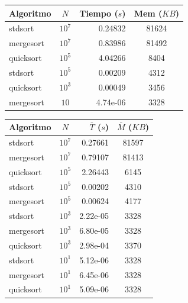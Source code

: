 \begin{itemize}
\begin{table}[H]
    \begin{minipage}[t]{0.45\textwidth}
        \centering
        \small
        \begin{tabular}{|l|c|r|c|}
            \hline
            \textbf{Algoritmo} & \textbf{$N$} & \textbf{Tiempo ($s$)} & \textbf{Mem ($KB$)} \\ \hline
            stdsort & $10^7$ & 0.24832 & 81624 \\ \hline
            mergesort & $10^7$ & 0.83986 & 81492 \\ \hline
            quicksort & $10^5$ & 4.04266 & 8404 \\ \hline
            stdsort & $10^5$ & 0.00209 & 4312 \\ \hline
            quicksort & $10^3$ & 0.00049 & 3456 \\ \hline
            mergesort & $10$ & 4.74e-06 & 3328 \\ \hline
        \end{tabular}
    \end{minipage}
    \hfill 
    \begin{minipage}[t]{0.52\textwidth}
        \centering
        \small
        \begin{tabular}{|l|c|r|c|}
            \hline
            \textbf{Algoritmo} & \textbf{$N$} & \textbf{$\bar{T}$ ($s$)} & \textbf{$\bar{M}$ ($KB$)} \\ \hline
            stdsort & $10^7$ & 0.27661 & 81597 \\ \hline
            mergesort & $10^7$ & 0.79107 & 81413 \\ \hline
            quicksort & $10^5$ & 2.26443 & 6145 \\ \hline
            stdsort & $10^5$ & 0.00202 & 4310 \\ \hline
            mergesort & $10^5$ & 0.00624 & 4177 \\ \hline
            stdsort & $10^3$ & 2.22e-05 & 3328 \\ \hline
            mergesort & $10^3$ & 6.80e-05 & 3328 \\ \hline
            quicksort & $10^3$ & 2.98e-04 & 3370 \\ \hline
            stdsort & $10^1$ & 5.12e-06 & 3328 \\ \hline
            mergesort & $10^1$ & 6.45e-06 & 3328 \\ \hline
            quicksort & $10^1$ & 5.09e-06 & 3328 \\ \hline
        \end{tabular}
    \end{minipage}
    \end{table}


\end{itemize}
